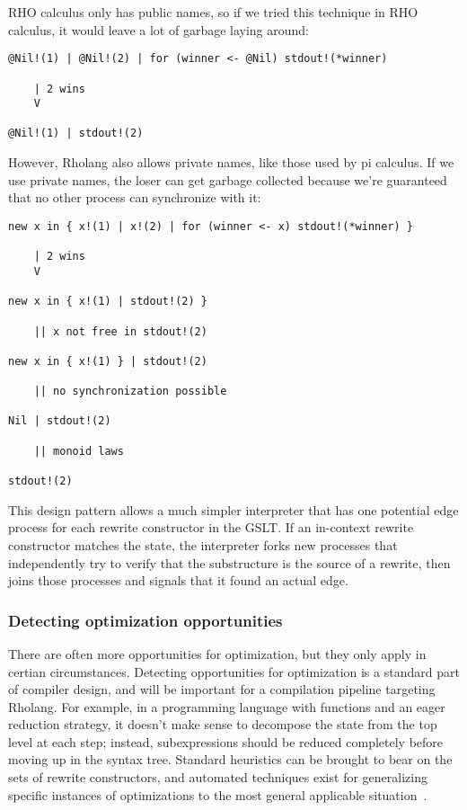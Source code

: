 \documentclass{article}
\begin{document}
RHO calculus only has public names, so if we tried this technique in RHO calculus, it would leave a lot of garbage laying around:

\begin{verbatim}
@Nil!(1) | @Nil!(2) | for (winner <- @Nil) stdout!(*winner)

    | 2 wins
    V

@Nil!(1) | stdout!(2)
\end{verbatim}

\noindent However, Rholang also allows private names, like those used by pi calculus.  If we use private names, the loser can get garbage collected because we're guaranteed that no other process can synchronize with it:

\begin{verbatim}
new x in { x!(1) | x!(2) | for (winner <- x) stdout!(*winner) }

    | 2 wins
    V

new x in { x!(1) | stdout!(2) }

    || x not free in stdout!(2)

new x in { x!(1) } | stdout!(2)

    || no synchronization possible

Nil | stdout!(2)

    || monoid laws

stdout!(2)
\end{verbatim}

This design pattern allows a much simpler interpreter that has one potential edge process for each rewrite constructor in the GSLT.  If an in-context rewrite constructor matches the state, the interpreter forks new processes that independently try to verify that the substructure is the source of a rewrite, then joins those processes and signals that it found an actual edge.

\subsubsection{Detecting optimization opportunities}

There are often more opportunities for optimization, but they only apply in certian circumstances.  Detecting opportunities for optimization is a standard part of compiler design, and will be important for a compilation pipeline targeting Rholang.  For example, in a programming language with functions and an eager reduction strategy, it doesn't make sense to decompose the state from the top level at each step; instead, subexpressions should be reduced completely before moving up in the syntax tree.  Standard heuristics can be brought to bear on the sets of rewrite constructors, and automated techniques exist for generalizing specific instances of optimizations to the most general applicable situation~\cite{Tate2010}.
\end{document}
